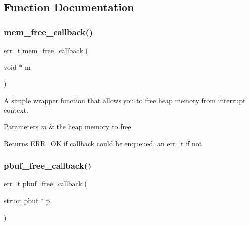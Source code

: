 \subsection{Function Documentation}
\mbox{\label{openmote-cc2538_2lwip_2src_2api_2tcpip_8c_a55b4de3765c6a37b3f2b26a11603771c}} 
\subsubsection{\texorpdfstring{mem\+\_\+free\+\_\+callback()}{mem\_free\_callback()}}
{\footnotesize\ttfamily \hyperlink{group__infrastructure__errors_gaf02d9da80fd66b4f986d2c53d7231ddb}{err\+\_\+t} mem\+\_\+free\+\_\+callback (\begin{DoxyParamCaption}\item[{void $\ast$}]{m }\end{DoxyParamCaption})}

A simple wrapper function that allows you to free heap memory from interrupt context.


\begin{DoxyParams}{Parameters}
{\em m} & the heap memory to free \\
\hline
\end{DoxyParams}
\begin{DoxyReturn}{Returns}
E\+R\+R\+\_\+\+OK if callback could be enqueued, an err\+\_\+t if not 
\end{DoxyReturn}
\mbox{\label{openmote-cc2538_2lwip_2src_2api_2tcpip_8c_a5cdcb6b784fe0e8736a5b31a5cfbed6c}} 
\subsubsection{\texorpdfstring{pbuf\+\_\+free\+\_\+callback()}{pbuf\_free\_callback()}}
{\footnotesize\ttfamily \hyperlink{group__infrastructure__errors_gaf02d9da80fd66b4f986d2c53d7231ddb}{err\+\_\+t} pbuf\+\_\+free\+\_\+callback (\begin{DoxyParamCaption}\item[{struct \hyperlink{structpbuf}{pbuf} $\ast$}]{p }\end{DoxyParamCaption})}

